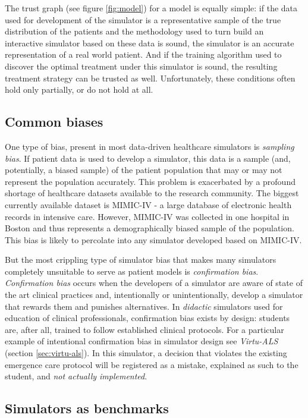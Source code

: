 The trust graph (see figure \ref{fig:model}) for a model is equally simple: if the data used for development of the simulator is a representative sample of the true distribution of the patients and the methodology used to turn build an interactive simulator based on these data is sound, the simulator is an accurate representation of a real world patient.
And if the training algorithm used to discover the optimal treatment under this simulator is sound, the resulting treatment strategy can be trusted as well.
Unfortunately, these conditions often hold only partially, or do not hold at all.

\subsection{Common biases}
\label{sec:bias}

One type of bias, present in most data-driven healthcare simulators is \emph{sampling bias}.
If patient data is used to develop a simulator, this data is a sample (and, potentially, a biased sample) of the patient population that may or may not represent the population accurately.
This problem is exacerbated by a profound shortage of healthcare datasets available to the research community.
The biggest currently available dataset is MIMIC-IV \cite{mimic} - a large database of electronic health records in intensive care.
However, MIMIC-IV was collected in one hospital in Boston and thus represents a demographically biased sample of the population.
This bias is likely to percolate into any simulator developed based on MIMIC-IV.

But the most crippling type of simulator bias that makes many simulators completely unsuitable to serve as patient models is \emph{confirmation bias}.
\emph{Confirmation bias} occurs when the developers of a simulator are aware of state of the art clinical practices and, intentionally or unintentionally, develop a simulator that rewards them and punishes alternatives.  
In \emph{didactic} simulators used for education of clinical professionals, confirmation bias exists by design: students are, after all, trained to follow established clinical protocols.
For a particular example of intentional confirmation bias in simulator design see \emph{Virtu-ALS} (section \ref{sec:virtu-als}). 
In this simulator, a decision that violates the existing emergence care protocol will be registered as a mistake, explained as such to the student, and \emph{not actually implemented}.

\subsection{Simulators as benchmarks}

